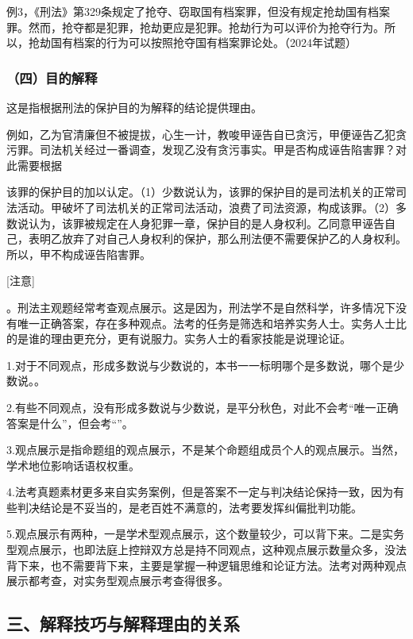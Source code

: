 例3，《刑法》第329条规定了抢夺、窃取国有档案罪，但没有规定抢劫国有档案罪。然而，抢夺都是犯罪，抢劫更应是犯罪。抢劫行为可以评价为抢夺行为。所以，抢劫国有档案的行为可以按照抢夺国有档案罪论处。（2024年试题）

\subsubsection*{（四）目的解释}

这是指根据刑法的保护目的为解释的结论提供理由。

例如，乙为官清廉但不被提拔，心生一计，教唆甲诬告自已贪污，甲便诬告乙犯贪污罪。司法机关经过一番调查，发现乙没有贪污事实。甲是否构成诬告陷害罪？对此需要根据

该罪的保护目的加以认定。（1）少数说认为，该罪的保护目的是司法机关的正常司法活动。甲破坏了司法机关的正常司法活动，浪费了司法资源，构成该罪。（2）多数说认为，该罪被规定在人身犯罪一章，保护目的是人身权利。乙同意甲诬告自己，表明乙放弃了对自己人身权利的保护，那么刑法便不需要保护乙的人身权利。所以，甲不构成诬告陷害罪。

[注意]

。刑法主观题经常考查观点展示。这是因为，刑法学不是自然科学，许多情况下没有唯一正确答案，存在多种观点。法考的任务是筛选和培养实务人士。实务人士比的是谁的理由更充分，更有说服力。实务人士的看家技能是说理论证。

1.对于不同观点，形成多数说与少数说的，本书一一标明哪个是多数说，哪个是少数说。。

2.有些不同观点，没有形成多数说与少数说，是平分秋色，对此不会考“唯一正确答案是什么”，但会考“”。

3.观点展示是指命题组的观点展示，不是某个命题组成员个人的观点展示。当然，学术地位影响话语权权重。

4.法考真题素材更多来自实务案例，但是答案不一定与判决结论保持一致，因为有些判决结论是不妥当的，是老百姓不满意的，法考要发挥纠偏批判功能。

5.观点展示有两种，一是学术型观点展示，这个数量较少，可以背下来。二是实务型观点展示，也即法庭上控辩双方总是持不同观点，这种观点展示数量众多，没法背下来，也不需要背下来，主要是掌握一种逻辑思维和论证方法。法考对两种观点展示都考查，对实务型观点展示考查得很多。

\subsection*{三、解释技巧与解释理由的关系}

